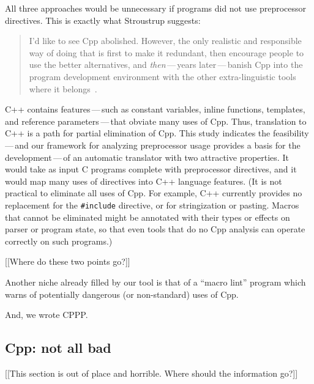 \documentclass[10pt]{article}
\begin{document}
All three approaches would be unnecessary if programs did not use
preprocessor directives.  This is exactly what Stroustrup suggests:
\begin{quote}
  I'd like to see Cpp abolished.  However, the only realistic and
  responsible way of doing that is first to make it redundant, then
  encourage people to use the better alternatives, and {\em then\/}\,---\,years
  later\,---\,banish Cpp into the program development environment with the
  other extra-linguistic tools where it
  belongs~\cite[p.~426]{Stroustrup-DesignEvolution}.
\end{quote}
C++ contains features\,---\,such as constant variables, inline functions,
templates, and reference parameters\,---\,that obviate many uses of Cpp.
Thus, translation to C++ is a path for partial elimination of Cpp.
This study indicates the
feasibility\,---\,and our framework for analyzing preprocessor usage
provides a basis for the development\,---\,of an automatic translator with
two attractive properties.  It would take as input C programs complete with
preprocessor directives, and it would map many uses of directives into C++
language features.  (It is not 
practical to eliminate all uses of Cpp.  For example, C++ currently
provides no replacement for the {\tt \#include} directive, or for
stringization or pasting.  Macros that cannot be eliminated might be
annotated with their types or 
effects on parser or program state, so that even tools that do no Cpp
analysis can operate correctly on such programs.)

[[Where do these two points go?]]

Another niche already filled by our tool is that of a ``macro lint''
program which warns of potentially dangerous (or non-standard) uses of Cpp.

And, we wrote CPPP.



\subsection{Cpp: not all bad}

[[This section is out of place and horrible.  Where should the information
go?]]
\end{document}
